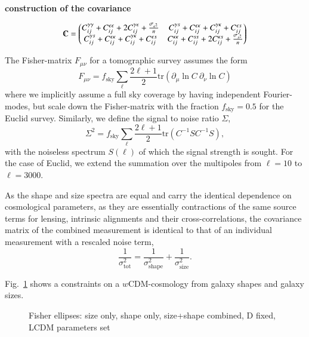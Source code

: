 \documentclass[a4paper,fleqn,usenatbib]{mnras}
\def\spirou#1{{\bf #1}}
\begin{document}
\spirou{construction of the covariance}

$$\varmathbb{C}=\begin{pmatrix}
C_{ij}^{\gamma\gamma}+C_{ij}^{\epsilon\epsilon}+2C_{ij}^{\gamma\epsilon}+\frac{\sigma_{\epsilon^2}}{n} & C_{ij}^{\gamma s}+C_{ij}^{\epsilon\kappa}+C_{ij}^{\gamma\kappa}+C_{ij}^{\epsilon s}   \\
C_{ij}^{\gamma s}+C_{ij}^{\epsilon\kappa}+C_{ij}^{\gamma\kappa}+C_{ij}^{\epsilon s} & C_{ij}^{\kappa\kappa}+C_{ij}^{ss}+2C_{ij}^{\kappa s}+\frac{\sigma_{s^2}}{n}
\end{pmatrix}$$

The Fisher-matrix $F_{\mu\nu}$ for a tomographic survey assumes the form
\begin{equation}
F_{\mu\nu} = f_\mathrm{sky}\sum_\ell\frac{2\ell+1}{2}\mathrm{tr}\left(\partial_\mu\ln C\:\partial_\nu\ln C\right)
\end{equation}
where we implicitly assume a full sky coverage by having independent Fourier-modes, but scale down the Fisher-matrix with the fraction $f_\mathrm{sky} = 0.5$ for the Euclid survey. Similarly, we define the signal to noise ratio $\Sigma$,
\begin{equation}
\Sigma^2 = f_\mathrm{sky}\sum_\ell\frac{2\ell+1}{2}\mathrm{tr}\left(C^{-1}SC^{-1}S\right),
\end{equation}
with the noiseless spectrum $S(\ell)$ of which the signal strength is sought. For the case of Euclid, we extend the summation over the multipoles from $\ell=10$ to $\ell=3000$.


As the shape and size spectra are equal and carry the identical dependence on cosmological parameters, as they are essentially contractions of the same source terms for lensing, intrinsic alignments and their cross-correlations, the covariance matrix of the combined measurement is identical to that of an individual measurement with a rescaled noise term,
\begin{equation}
\frac{1}{\sigma^2_\mathrm{tot}} = \frac{1}{\sigma^2_\mathrm{shape}} + \frac{1}{\sigma^2_\mathrm{size}}.
\end{equation}


Fig.~\ref{fig:fisher} shows a constraints on a $w$CDM-cosmology from galaxy shapes and galaxy sizes.

\begin{figure}
\centering
\caption{Fisher ellipses: size only, shape only, size+shape combined, D fixed, LCDM parameters set}
\label{fig:fisher}
\end{figure}
\end{document}
